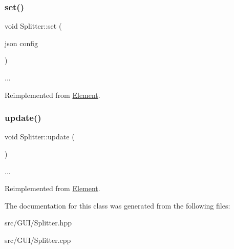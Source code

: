 \subsubsection{\texorpdfstring{set()}{set()}}
{\footnotesize\ttfamily void Splitter\+::set (\begin{DoxyParamCaption}\item[{json}]{config }\end{DoxyParamCaption})\hspace{0.3cm}{\ttfamily [virtual]}}

... 

Reimplemented from \hyperlink{class_element_af89dcf0a470753cf1fecd8556a802c63}{Element}.

\mbox{\label{class_splitter_aab6c9e9479d8208e1959eb9fbfbcdfeb}} 
\subsubsection{\texorpdfstring{update()}{update()}}
{\footnotesize\ttfamily void Splitter\+::update (\begin{DoxyParamCaption}{ }\end{DoxyParamCaption})\hspace{0.3cm}{\ttfamily [virtual]}}

... 

Reimplemented from \hyperlink{class_element_a35de04f6ab79440bb44083d8b300b87d}{Element}.



The documentation for this class was generated from the following files\+:\begin{DoxyCompactItemize}
\item 
src/\+G\+U\+I/Splitter.\+hpp\item 
src/\+G\+U\+I/Splitter.\+cpp\end{DoxyCompactItemize}
